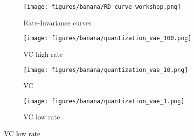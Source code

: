 \documentclass[final]{article}
\begin{document}
\begin{figure}
     \centering
     \begin{minipage}{.36\linewidth}
     \begin{subfigure}[h]{\linewidth}
         \centering
         \texttt{[image: figures/banana/RD\_curve\_workshop.png]}
         \vspace{-2em}
         \caption{Rate-Invariance curves}
         \label{fig:bananas_RI}
     \end{subfigure}
     \end{minipage}
     \qquad
     \begin{minipage}{.48\linewidth}
\begin{subfigure}{0.32\columnwidth}
         \centering
         \texttt{[image: figures/banana/quantization\_vae\_100.png]}
         \vspace{-1.3em}
         \caption{VC high rate}
         \label{fig:bananas_sweepvae_100}
     \end{subfigure}
     \begin{subfigure}{0.32\columnwidth}
         \centering
         \texttt{[image: figures/banana/quantization\_vae\_10.png]}
         \vspace{-1.3em}
         \caption{VC}
         \label{fig:bananas_sweepvae_10}
     \end{subfigure}
     \begin{subfigure}{0.32\columnwidth}
         \centering
         \texttt{[image: figures/banana/quantization\_vae\_1.png]}
         \vspace{-1.3em}
         \caption{VC low rate}
         \label{fig:bananas_sweepvae_1}
     \end{subfigure}
     

\end{minipage}
\end{figure}
\end{document}
